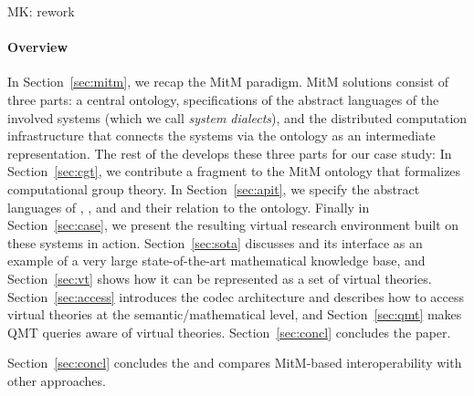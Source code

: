 \begin{newpart}{MK: rework}
\paragraph{Overview}
In Section~\ref{sec:mitm}, we recap the MitM paradigm.  MitM solutions consist of three
parts: a central ontology, specifications of the abstract languages of the involved
systems (which we call \emph{system dialects}), and the distributed computation
infrastructure that connects the systems via the ontology as an intermediate
representation.  The rest of the \papertype develops these three parts for our case study:
In Section~\ref{sec:cgt}, we contribute a fragment to the MitM ontology that formalizes
computational group theory.  In Section~\ref{sec:apit}, we specify the abstract languages
of \GAP, \Sage, and \Singular and their relation to the ontology.  Finally in
Section~\ref{sec:case}, we present the resulting virtual research environment built on
these systems in action. Section~\ref{sec:sota} discusses \lmfdb and its interface as an
example of a very large state-of-the-art mathematical knowledge base, and
Section~\ref{sec:vt} shows how it can be represented as a set of virtual theories.
Section~\ref{sec:access} introduces the codec architecture and describes how to access
virtual theories at the semantic/mathematical level, and Section~\ref{sec:qmt} makes QMT
queries aware of virtual theories.  Section~\ref{sec:concl} concludes the paper.


Section~\ref{sec:concl} concludes the \papertype and compares MitM-based interoperability with other approaches.
\end{newpart}


